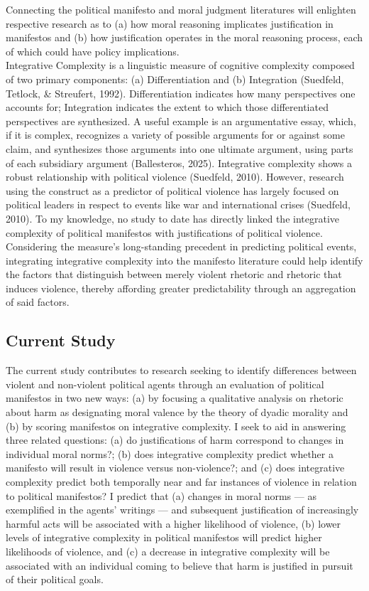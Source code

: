 \documentclass[
  english,
  man,floatsintext]{apa6}
\begin{document}
Connecting the political manifesto and moral judgment literatures will enlighten respective
research as to (a) how moral reasoning implicates justification in manifestos and (b) how
justification operates in the moral reasoning process, each of which could have policy
implications.\\
Integrative Complexity is a linguistic measure of cognitive complexity composed of two primary components: (a) Differentiation and (b) Integration (Suedfeld, Tetlock, \& Streufert, 1992). Differentiation indicates how many perspectives one accounts for; Integration indicates the extent to which those differentiated perspectives are synthesized. A useful example is an argumentative essay, which, if it is complex, recognizes a variety of possible arguments for or against some claim, and synthesizes those arguments into one ultimate argument, using parts of each subsidiary argument (Ballesteros, 2025). Integrative complexity shows a robust relationship with political violence (Suedfeld, 2010). However, research using the construct as a predictor of political violence has largely focused on political leaders in respect to events like war and international crises (Suedfeld, 2010). To my knowledge, no study to date has directly linked the integrative complexity of political manifestos with justifications of political violence. Considering the measure's long-standing precedent in predicting political events, integrating integrative complexity into the manifesto literature could help identify the factors that distinguish between merely violent rhetoric and rhetoric that induces violence, thereby affording greater predictability through an aggregation of said factors.

\subsection{Current Study}\label{current-study}

The current study contributes to research seeking to identify differences between violent and non-violent political agents through an evaluation of political manifestos in two new ways: (a) by focusing a qualitative analysis on rhetoric about harm as designating moral valence by the theory of dyadic morality and (b) by scoring manifestos on integrative complexity. I seek to aid in answering three related questions: (a) do justifications of harm correspond to changes in individual moral norms?; (b) does integrative complexity predict whether a manifesto will result in violence versus non-violence?; and (c) does integrative complexity predict both temporally near and far instances of violence in relation to political manifestos? I predict that (a) changes in moral norms --- as exemplified in the agents' writings --- and subsequent justification of increasingly harmful acts will be associated with a higher likelihood of violence, (b) lower levels of integrative complexity in political manifestos will predict higher likelihoods of violence, and (c) a decrease in integrative complexity will be associated with an individual coming to believe that harm is justified in pursuit of their political goals.
\end{document}
